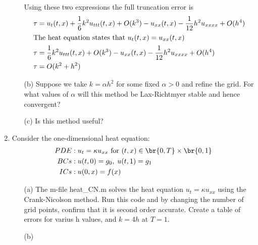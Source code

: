 \documentclass[11pt, oneside, titlepage]{article}
\begin{document}
\begin{enumerate}
\begin{enumerate}
                Using these two expressions the full truncation error is
                \begin{align*}
                    \tau &= u_t(t, x) + \frac{1}{6}k^2 u_{ttt}(t, x) + O(k^3) - u_{xx}(t, x) - \frac{1}{12} h^2 u_{xxxx} + O(h^4) \\
                    \intertext{The heat equation states that $u_t(t, x) = u_{xx}(t, x)$}
                    \tau &= \frac{1}{6}k^2 u_{ttt}(t, x) + O(k^3) - u_{xx}(t, x) - \frac{1}{12} h^2 u_{xxxx} + O(h^4) \\
                    \tau &= O(k^2 + h^2)
                \end{align*}

            \item[(b)]
                Suppose we take $k = \alpha h^2$ for some fixed $\alpha > 0$
                and refine the grid.
                For what values of $\alpha$ will this method be Lax-Richtmyer
                stable and hence convergent?

            \item[(c)]
                Is this method useful?
        \end{enumerate}

    \item %
        Consider the one-dimensional heat equation:
        \begin{align*}
            PDE &: u_t = \kappa u_{xx}\text{ for } (t, x) \in \br{0, T} \times \br{0, 1} \\
            BCs &: u(t, 0) = g_0, \; u(t, 1) = g_1 \\
            ICs &: u(0, x) = f(x)
        \end{align*}
        \begin{enumerate}
            \item[(a)]
                The m-file heat\_CN.m solves the heat equation
                $u_t = \kappa u_{xx}$ using the Crank-Nicolson method.
                Run this code and by changing the number of grid points,
                confirm that it is second order accurate.
                Create a table of errors for varius h values, and $k = 4h$ at
                $T = 1$.

            \item[(b)]
        \end{enumerate}

\end{enumerate}
\end{document}
